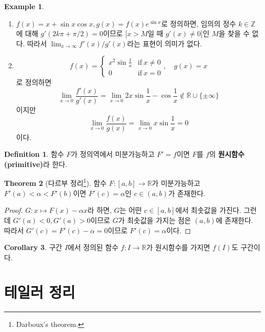 \documentclass[11pt]{book}
\numberwithin{equation}{chapter}
\def\ZZ{\mathbb{Z}}
\def\RR{\mathbb{R}}
\def\textif{\text{if}}
\theoremstyle{definition}
\newtheorem{thm}{Theorem}[section]
\newtheorem{cor}[thm]{Corollary}
\newtheorem{defn}[thm]{Definition}
\newtheorem*{ex}{Example}
\newenvironment{enum}
	{\begin{enumerate}[label=(\alph*), leftmargin=2\parindent]}
	{\end{enumerate}}
\begin{document}
\begin{ex}
    \quad

    \begin{enum}
        \item \(f(x) = x + \sin x \cos x, g(x) = f(x) e^{\sin x}\)로 정의하면,  임의의 정수 \(k \in \ZZ\)에 대해 \(g'(2k\pi + \pi/2) = 0\)이므로 [\(x > M\)일 때 \(g'(x) \ne 0\)]인 \(M\)을 찾을 수 없다. 따라서 \(\lim_{x \to \infty} f'(x) / g'(x)\)라는 표현이 의미가 없다.
        \item
        \[
        f(x) = \begin{cases}
            x^2 \sin \frac{1}{x} &\textif \ x \ne 0\\
            0 &\textif \  x= 0
        \end{cases}, \quad
        g(x) = x
        \]
        로 정의하면
        \[
          \lim_{x \to 0} \frac{f'(x)}{g'(x)} = \lim_{x \to 0} 2x\sin\frac{1}{x} - \cos\frac{1}{x} \notin \RR \cup \{\pm\infty\}  
        \]
        이지만
        \[
          \lim_{x \to 0} \frac{f(x)}{g(x)}  = \lim_{x \to 0} x \sin \frac{1}{x} = 0
        \]
        이다.
    \end{enum}
\end{ex}

\begin{defn}
    함수 \(F\)가 정의역에서 미분가능하고 \(F' = f\)이면 \(F\)를 \(f\)의 \textbf{원시함수(primitive)}라 한다.
\end{defn}

\begin{thm}[다르부 정리\footnote{Darboux's theorem.}]
    함수 \(F : [a, b] \to \RR\)가 미분가능하고 \(F'(a) < \alpha < F'(b)\)이면 \(F'(c) = \alpha\)인 \(c \in (a, b)\)가 존재한다.
\end{thm}
\begin{proof}
    \(G : x \mapsto F(x) - \alpha x\)라 하면, \(G\)는 어떤 \(c \in [a, b]\)에서 최솟값을 가진다. 그런데 \(G'(a) < 0, G'(a) > 0\)이므로 \(G\)가 최솟값을 가지는 점은 \((a, b)\)에 존재한다. 따라서 \(G'(c) = F'(c) - \alpha = 0\)이므로 \(F'(c) = \alpha\)이다.
\end{proof}

\begin{cor}
    구간 \(I\)에서 정의된 함수 \(f : I \to \RR\)가 원시함수를 가지면 \(f(I)\)도 구간이다.
\end{cor}

\section{테일러 정리}
\end{document}
